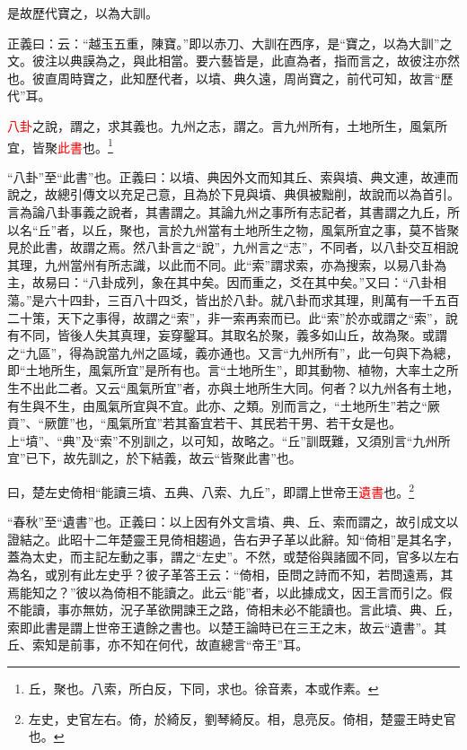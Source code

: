 是故歷代寶之，以為大訓。

{\noindent\shu{}\fzkt 正義曰：云：“越玉五重，陳寶。”即以赤刀、大訓在西序，是“寶之，以為大訓”之文。彼注以典謨為之，與此相當。要六藝皆是，此直為者，指而言之，故彼注亦然也。彼直周時寶之，此知歷代者，以墳、典久遠，周尚寶之，前代可知，故言“歷代”耳。 \par}

\textcolor{red}{八卦}之說，謂之，求其義也。九州之志，謂之。言九州所有，土地所生，風氣所宜，皆聚\textcolor{red}{此書}也。\footnote{丘，聚也。八索，所白反，下同，求也。徐音素，本或作素。}

{\noindent\shu{}\fzkt “八卦”至“此書”也。正義曰：以墳、典因外文而知其丘、索與墳、典文連，故連而說之，故總引傳文以充足己意，且為於下見與墳、典俱被黜削，故說而以為首引。言為論八卦事義之說者，其書謂之。其論九州之事所有志記者，其書謂之九丘，所以名“丘”者，以丘，聚也，言於九州當有土地所生之物，風氣所宜之事，莫不皆聚見於此書，故謂之焉。然八卦言之“說”，九州言之“志”，不同者，以八卦交互相說其理，九州當州有所志識，以此而不同。此“索”謂求索，亦為搜索，以易八卦為主，故易曰：“八卦成列，象在其中矣。因而重之，爻在其中矣。”又曰：“八卦相蕩。”是六十四卦，三百八十四爻，皆出於八卦。就八卦而求其理，則萬有一千五百二十策，天下之事得，故謂之“索”，非一索再索而已。此“索”於亦或謂之“索”，說有不同，皆後人失其真理，妄穿鑿耳。其取名於聚，義多如山丘，故為聚。或謂之“九區”，得為說當九州之區域，義亦通也。又言“九州所有”，此一句與下為總，即“土地所生，風氣所宜”是所有也。言“土地所生”，即其動物、植物，大率土之所生不出此二者。又云“風氣所宜”者，亦與土地所生大同。何者？以九州各有土地，有生與不生，由風氣所宜與不宜。此亦、之類。別而言之，“土地所生”若之“厥貢”、“厥篚”也，“風氣所宜”若其畜宜若干、其民若干男、若干女是也。上“墳”、“典”及“索”不別訓之，以可知，故略之。“丘”訓既難，又須別言“九州所宜”已下，故先訓之，於下結義，故云“皆聚此書”也。 \par}

曰，楚左史倚相“能讀三墳、五典、八索、九丘”，即謂上世帝王\textcolor{red}{遺書}也。\footnote{左史，史官左右。倚，於綺反，劉琴綺反。相，息亮反。倚相，楚靈王時史官也。}

{\noindent\shu{}\fzkt “春秋”至“遺書”也。正義曰：以上因有外文言墳、典、丘、索而謂之，故引成文以證結之。此昭十二年楚靈王見倚相趨過，告右尹子革以此辭。知“倚相”是其名字，蓋為太史，而主記左動之事，謂之“左史”。不然，或楚俗與諸國不同，官多以左右為名，或別有此左史乎？彼子革答王云：“倚相，臣問之詩而不知，若問遠焉，其焉能知之？”彼以為倚相不能讀之。此云“能”者，以此據成文，因王言而引之。假不能讀，事亦無妨，況子革欲開諫王之路，倚相未必不能讀也。言此墳、典、丘，索即此書是謂上世帝王遺餘之書也。以楚王論時已在三王之末，故云“遺書”。其丘、索知是前事，亦不知在何代，故直總言“帝王”耳。 \par}

